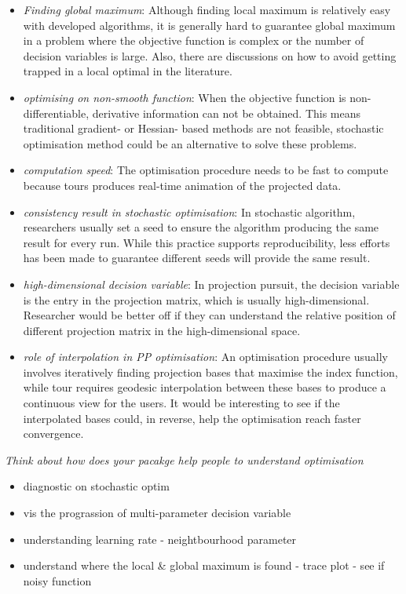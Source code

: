\documentclass[12pt]{article}
\providecommand{\tightlist}{%
  \setlength{\itemsep}{0pt}\setlength{\parskip}{0pt}}
\begin{document}
\begin{itemize}
\item
  \emph{Finding global maximum}: Although finding local maximum is
  relatively easy with developed algorithms, it is generally hard to
  guarantee global maximum in a problem where the objective function is
  complex or the number of decision variables is large. Also, there are
  discussions on how to avoid getting trapped in a local optimal in the
  literature.
\item
  \emph{optimising on non-smooth function}: When the objective function
  is non-differentiable, derivative information can not be obtained.
  This means traditional gradient- or Hessian- based methods are not
  feasible, stochastic optimisation method could be an alternative to
  solve these problems.
\item
  \emph{computation speed}: The optimisation procedure needs to be fast
  to compute because tours produces real-time animation of the projected
  data.
\item
  \emph{consistency result in stochastic optimisation}: In stochastic
  algorithm, researchers usually set a seed to ensure the algorithm
  producing the same result for every run. While this practice supports
  reproducibility, less efforts has been made to guarantee different
  seeds will provide the same result.
\item
  \emph{high-dimensional decision variable}: In projection pursuit, the
  decision variable is the entry in the projection matrix, which is
  usually high-dimensional. Researcher would be better off if they can
  understand the relative position of different projection matrix in the
  high-dimensional space.
\item
  \emph{role of interpolation in PP optimisation}: An optimisation
  procedure usually involves iteratively finding projection bases that
  maximise the index function, while tour requires geodesic
  interpolation between these bases to produce a continuous view for the
  users. It would be interesting to see if the interpolated bases could,
  in reverse, help the optimisation reach faster convergence.
\end{itemize}

\emph{Think about how does your pacakge help people to understand
optimisation}

\begin{itemize}
\tightlist
\item
  diagnostic on stochastic optim
\item
  vis the prograssion of multi-parameter decision variable
\item
  understanding learning rate - neightbourhood parameter
\item
  understand where the local \& global maximum is found - trace plot -
  see if noisy function
\end{itemize}
\end{document}
